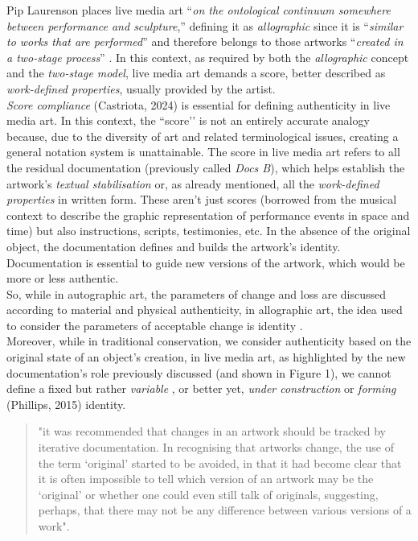 Pip Laurenson places live media art ``\textit{on the ontological continuum somewhere between performance and sculpture},'' defining it as \textit{allographic} since it is ``\textit{similar to works that are performed}'' and therefore belongs to those artworks ``\textit{created in a two-stage process}'' \cite{laurenson2006authenticity}. In this context, as required by both the \textit{allographic} concept and the \textit{two-stage model}, live media art demands a score, better described as \textit{work-defined properties}, usually provided by the artist.\\
\textit{Score compliance} (Castriota, 2024) is essential for defining authenticity in live media art. In this context, the ``score’’ is not an entirely accurate analogy because, due to the diversity of art and related terminological issues, creating a general notation system is unattainable. The score in live media art refers to all the residual documentation (previously called \textit{Docs B}), which helps establish the artwork's \textit{textual stabilisation} \cite{holling2016aesthetics} or, as already mentioned, all the \textit{work-defined properties} in written form. These aren’t just scores (borrowed from the musical context to describe the graphic representation of performance events in space and time) but also instructions, scripts, testimonies, etc. In the absence of the original object, the documentation defines and builds the artwork's identity. Documentation is essential to guide new versions of the artwork, which would be more or less authentic.\\
So, while in autographic art, the parameters of change and loss are discussed according to material and physical authenticity, in allographic art, the idea used to consider the parameters of acceptable change is identity \cite{laurenson2006authenticity}.\\
Moreover, while in traditional conservation, we consider authenticity based on the original state of an object's creation, in live media art, as highlighted by the new documentation's role previously discussed (and shown in Figure 1), we cannot define a fixed but rather \textit{variable} \cite{groys2008art}, or better yet, \textit{under construction} \cite{dekker2022documentation} or \textit{forming} (Phillips, 2015) identity.
\begin{quote}
    "it was recommended that changes in an artwork should be tracked by iterative documentation. In recognising that artworks change, the use of the term ‘original’ started to be avoided, in that it had become clear that it is often impossible to tell which version of an artwork may be the ‘original’ or whether one could even still talk of originals, suggesting, perhaps, that there may not be any difference between various versions of a work". \cite{giannachi2022use}
\end{quote}
